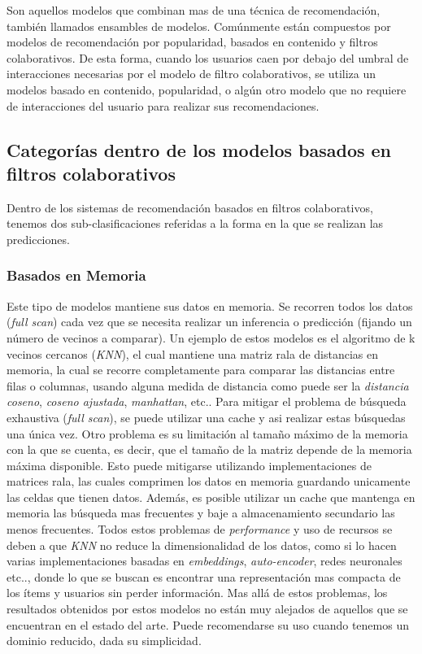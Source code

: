 \documentclass[11pt,a4paper,twoside]{thesis}
\begin{document}
Son aquellos modelos que combinan mas de una técnica de recomendación, también
llamados ensambles de modelos. Comúnmente están compuestos por modelos de
recomendación por popularidad, basados en contenido y filtros colaborativos. De
esta forma, cuando los usuarios caen por debajo del umbral de interacciones
necesarias por el modelo de filtro colaborativos, se utiliza un modelos basado
en contenido, popularidad, o algún otro modelo que no requiere de interacciones
del usuario para realizar sus recomendaciones.

\subsection{Categorías dentro de los modelos basados en filtros colaborativos}

Dentro de los sistemas de recomendación basados en filtros colaborativos,
tenemos dos sub-clasificaciones referidas a la forma en la que se realizan las
predicciones.

\subsubsection{Basados en Memoria}

Este tipo de modelos mantiene sus datos en memoria. Se recorren todos los datos
(\textit{full scan}) cada vez que se necesita realizar un inferencia o
predicción (fijando un número de vecinos a comparar). Un ejemplo de estos
modelos es el algoritmo de k vecinos cercanos (\textit{KNN}), el cual mantiene
una matriz rala de distancias en memoria, la cual se recorre completamente para
comparar las distancias entre filas o columnas, usando alguna medida de
distancia como puede ser la \textit{distancia coseno}, \textit{coseno
	ajustada}, \textit{manhattan}, etc.. Para mitigar el problema de búsqueda
exhaustiva (\textit{full scan}), se puede utilizar una cache y asi realizar
estas búsquedas una única vez. Otro problema es su limitación al tamaño máximo
de la memoria con la que se cuenta, es decir, que el tamaño de la matriz
depende de la memoria máxima disponible. Esto puede mitigarse utilizando
implementaciones de matrices rala, las cuales comprimen los datos en memoria
guardando unicamente las celdas que tienen datos. Además, es posible utilizar
un cache que mantenga en memoria las búsqueda mas frecuentes y baje a
almacenamiento secundario las menos frecuentes. Todos estos problemas de
\textit{performance} y uso de recursos se deben a que \textit{KNN} no reduce la
dimensionalidad de los datos, como si lo hacen varias implementaciones basadas
en \textit{embeddings}, \textit{auto-encoder}, redes neuronales etc.., donde lo
que se buscan es encontrar una representación mas compacta de los ítems y
usuarios sin perder información. Mas allá de estos problemas, los resultados
obtenidos por estos modelos no están muy alejados de aquellos que se encuentran
en el estado del arte. Puede recomendarse su uso cuando tenemos un dominio
reducido, dada su simplicidad.
\end{document}
